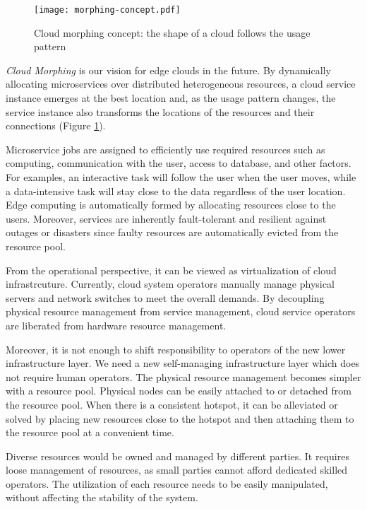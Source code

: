 \begin{figure}[tb]
  \begin{center}
    \texttt{[image: morphing-concept.pdf]}
    \vspace{-2.0ex}
    \caption{Cloud morphing concept: the shape of a cloud follows the
      usage pattern}
    \label{fig:concept}
  \end{center}
\end{figure}

{\em Cloud Morphing} is our vision for edge clouds in the future.
By dynamically allocating microservices over distributed
heterogeneous resources, a cloud service instance emerges at the best
location and, as the usage pattern changes, the service instance also
transforms the locations of the resources and their connections
(Figure \ref{fig:concept}).

Microservice jobs are assigned to efficiently use required resources
such as computing, communication with the user, access to
database, and other factors.
For examples, an interactive task will follow the user when the user
moves, while a data-intensive task will stay close to the data
regardless of the user location.
Edge computing is automatically formed by allocating resources close to
the users.
Moreover, services are inherently fault-tolerant and resilient
against outages or disasters since faulty resources are
automatically evicted from the resource pool.

From the operational perspective, it can be viewed as virtualization
of cloud infrastrcuture.
Currently, cloud system operators manually manage physical servers and
network switches to meet the overall demands.
By decoupling physical resource management from service management,
cloud service operators are liberated from hardware resource management.

Moreover, it is not enough to shift responsibility to operators of the
new lower infrastructure layer. We need a new self-managing
infrastructure layer which does not require human operators.
The physical resource management becomes simpler with a resource pool.
Physical nodes can be easily attached to or detached from the resource pool.
When there is a consistent hotspot, it can be alleviated or solved by
placing new resources close to the hotspot and then attaching them to
the resource pool at a convenient time.

Diverse resources would be owned and managed by different parties.
It requires loose management of resources, as small parties cannot
afford dedicated skilled operators.
The utilization of each resource needs to be easily manipulated,
without affecting the stability of the system.

